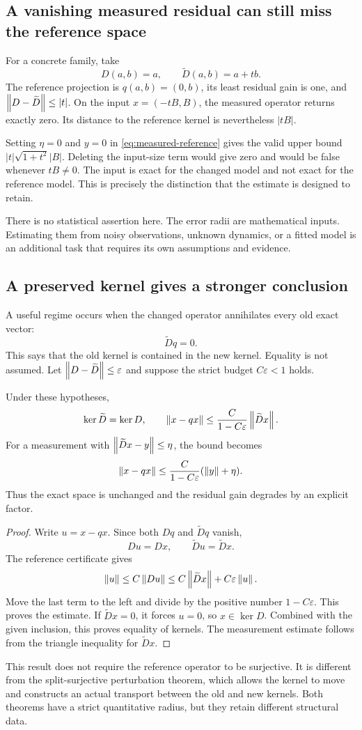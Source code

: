 \subsection{A vanishing measured residual can still miss the reference space}
For a concrete family, take
\[
 D(a,b)=a,\qquad \widetilde D(a,b)=a+tb.
\]
The reference projection is \(q(a,b)=(0,b)\), its least residual gain is one, and \(\left\lVert D-\widetilde D\right\rVert\le|t|\). On the input \(x=(-tB,B)\), the measured operator returns exactly zero. Its distance to the reference kernel is nevertheless \(|tB|\).

Setting \(\eta=0\) and \(y=0\) in \eqref{eq:measured-reference} gives the valid upper bound \(|t|\sqrt{1+t^2}|B|\). Deleting the input-size term would give zero and would be false whenever \(tB\ne0\). The input is exact for the changed model and not exact for the reference model. This is precisely the distinction that the estimate is designed to retain.

There is no statistical assertion here. The error radii are mathematical inputs. Estimating them from noisy observations, unknown dynamics, or a fitted model is an additional task that requires its own assumptions and evidence.

\subsection{A preserved kernel gives a stronger conclusion}
A useful regime occurs when the changed operator annihilates every old exact vector:
\[
 \widetilde D q=0.
\]
This says that the old kernel is contained in the new kernel. Equality is not assumed. Let \(\left\lVert D-\widetilde D\right\rVert\le\varepsilon\) and suppose the strict budget \(C\varepsilon<1\) holds.

\begin{theorem}\label{KS70}
Under these hypotheses,
\[
 \ker\widetilde D=\ker D,
 \qquad
 \left\lVert x-qx\right\rVert\le\frac{C}{1-C\varepsilon}\left\lVert\widetilde D x\right\rVert.
\]
For a measurement with \(\left\lVert\widetilde D x-y\right\rVert\le\eta\), the bound becomes
\[
 \left\lVert x-qx\right\rVert\le\frac{C}{1-C\varepsilon}(\left\lVert y\right\rVert+\eta).
\]
Thus the exact space is unchanged and the residual gain degrades by an explicit factor.
\end{theorem}
\begin{proof}
Write \(u=x-qx\). Since both \(Dq\) and \(\widetilde Dq\) vanish,
\[
 Du=Dx,\qquad\widetilde D u=\widetilde D x.
\]
The reference certificate gives
\[
 \left\lVert u\right\rVert\le C\left\lVert Du\right\rVert
 \le C\left\lVert\widetilde D x\right\rVert+C\varepsilon\left\lVert u\right\rVert.
\]
Move the last term to the left and divide by the positive number \(1-C\varepsilon\). This proves the estimate. If \(\widetilde D x=0\), it forces \(u=0\), so \(x\in\ker D\). Combined with the given inclusion, this proves equality of kernels. The measurement estimate follows from the triangle inequality for \(\widetilde D x\).
\end{proof}
This result does not require the reference operator to be surjective. It is different from the split-surjective perturbation theorem, which allows the kernel to move and constructs an actual transport between the old and new kernels. Both theorems have a strict quantitative radius, but they retain different structural data.

